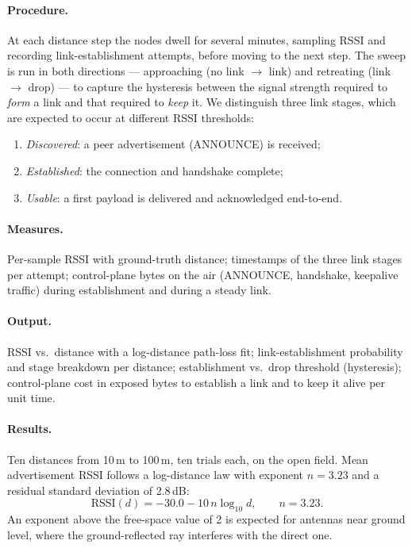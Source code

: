 \paragraph{Procedure.} At each distance step the nodes dwell for several minutes,
sampling RSSI and recording link-establishment attempts, before moving to the next
step. The sweep is run in both directions --- approaching (no link $\to$ link) and
retreating (link $\to$ drop) --- to capture the hysteresis between the signal strength
required to \emph{form} a link and that required to \emph{keep} it. We distinguish
three link stages, which are expected to occur at different RSSI thresholds:
\begin{enumerate}
    \item \emph{Discovered}: a peer advertisement (ANNOUNCE) is received;
    \item \emph{Established}: the connection and handshake complete;
    \item \emph{Usable}: a first payload is delivered and acknowledged end-to-end.
\end{enumerate}

\paragraph{Measures.} Per-sample RSSI with ground-truth distance; timestamps of the
three link stages per attempt; control-plane bytes on the air (ANNOUNCE, handshake,
keepalive traffic) during establishment and during a steady link.

\paragraph{Output.} RSSI vs.\ distance with a log-distance path-loss fit;
link-establishment probability and stage breakdown per distance; establishment vs.\
drop threshold (hysteresis); control-plane cost in exposed bytes to establish a link
and to keep it alive per unit time.

\paragraph{Results.} Ten distances from 10\,m to 100\,m, ten trials each, on the
open field. Mean advertisement RSSI follows a log-distance law with exponent
$n=3.23$ and a residual standard deviation of 2.8\,dB:
%
\begin{equation}
  \mathrm{RSSI}(d) = -30.0 - 10\,n \log_{10} d, \qquad n = 3.23 .
  \label{eq:pathloss}
\end{equation}
%
An exponent above the free-space value of 2 is expected for antennas near
ground level, where the ground-reflected ray interferes with the direct one.


